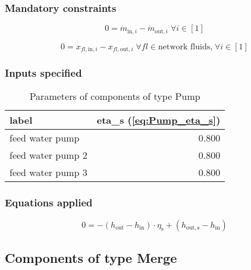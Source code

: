 \subsubsection{Mandatory constraints}

\begin{equation}
\label{eq:Pump_mass_flow_constraints}
0=\dot{m}_{\mathrm{in,}i}-\dot{m}_{\mathrm{out,}i}\; \forall i \in [1]
\end{equation}

\begin{equation}
\label{eq:Pump_fluid_constraints}
0=x_{fl\mathrm{,in,}i}-x_{fl\mathrm{,out,}i}\;\forall fl \in\text{network fluids,}\; \forall i \in [1]
\end{equation}


\subsubsection{Inputs specified}

\begin{table}[H]\begin{center}
\begin{tabular}{lr}
\toprule
             label &  eta\_s (\ref{eq:Pump_eta_s}) \\
\midrule
   feed water pump &                         0.800 \\
 feed water pump 2 &                         0.800 \\
 feed water pump 3 &                         0.800 \\
\bottomrule
\end{tabular}
\caption{Parameters of components of type Pump}
\end{center}\end{table}

\subsubsection{Equations applied}

\begin{equation}
\label{eq:Pump_eta_s}
0 =-\left(h_\mathrm{out}-h_\mathrm{in}\right)\cdot\eta_\mathrm{s}+\left(h_\mathrm{out,s}-h_\mathrm{in}\right)
\end{equation}


\subsection{Components of type Merge}

